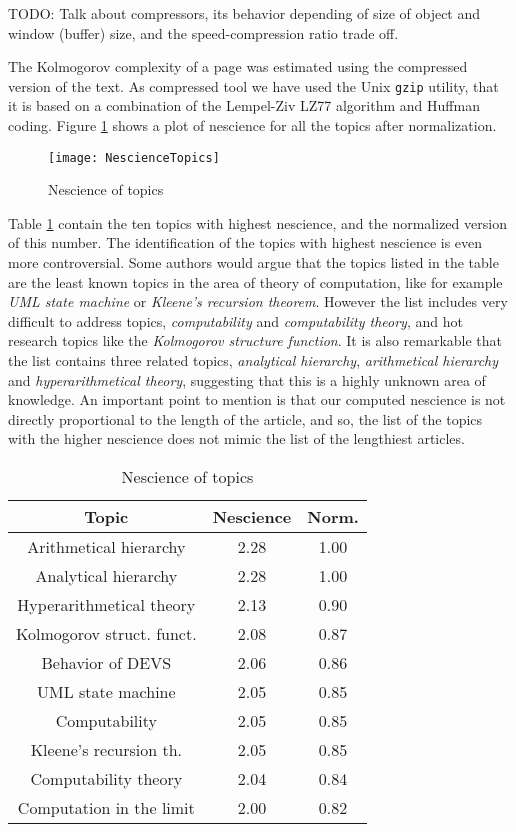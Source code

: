 {\color{red} TODO: Talk about compressors, its behavior depending of size of object and window (buffer) size, and the speed-compression ratio trade off.}

The Kolmogorov complexity of a page was estimated using the compressed
version of the text. As compressed tool we have used the Unix \texttt{gzip}
utility, that it is based on a combination of the Lempel-Ziv LZ77
algorithm and Huffman coding. Figure \ref{fig:Nescience-of-Topics}
shows a plot of nescience for all the topics after normalization.

\begin{figure}[h]
\centering\texttt{[image: NescienceTopics]}
\caption{\label{fig:Nescience-of-Topics}Nescience of topics}
\end{figure}

Table \ref{tab:Nescience-of-topics} contain the ten topics with highest
nescience, and the normalized version of this number. The identification
of the topics with highest nescience is even more controversial. Some
authors would argue that the topics listed in the table are the least
known topics in the area of theory of computation, like for example
\emph{UML state machine} or \emph{Kleene's recursion theorem}. However
the list includes very difficult to address topics, \emph{computability}
and \emph{computability theory}, and hot research topics like the
\emph{Kolmogorov structure function}. It is also remarkable that the
list contains three related topics, \emph{analytical hierarchy}, \emph{arithmetical
hierarchy} and \emph{hyperarithmetical theory}, suggesting that this
is a highly unknown area of knowledge. An important point to mention
is that our computed nescience is not directly proportional to the
length of the article, and so, the list of the topics with the higher
nescience does not mimic the list of the lengthiest articles.

\begin{table}
\begin{centering}
\begin{tabular}{|c|c|c|}
\hline 
Topic & Nescience & Norm.\tabularnewline
\hline 
\hline 
Arithmetical hierarchy & 2.28 & 1.00\tabularnewline
\hline 
Analytical hierarchy & 2.28 & 1.00\tabularnewline
\hline 
Hyperarithmetical theory & 2.13 & 0.90\tabularnewline
\hline 
Kolmogorov struct. funct. & 2.08 & 0.87\tabularnewline
\hline 
Behavior of DEVS & 2.06 & 0.86\tabularnewline
\hline 
UML state machine & 2.05 & 0.85\tabularnewline
\hline 
Computability & 2.05 & 0.85\tabularnewline
\hline 
Kleene's recursion th. & 2.05 & 0.85\tabularnewline
\hline 
Computability theory & 2.04 & 0.84\tabularnewline
\hline 
Computation in the limit & 2.00 & 0.82\tabularnewline
\hline 
\end{tabular}
\par\end{centering}

\caption{\label{tab:Nescience-of-topics}Nescience of topics}
\end{table}


